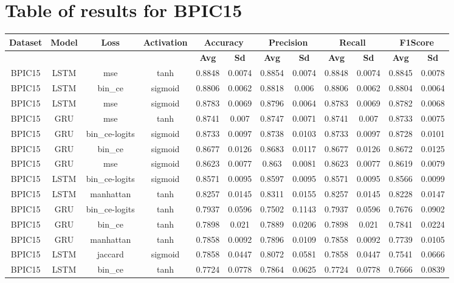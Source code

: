 \documentclass{article}%
\begin{document}
%
\normalsize%
\section{Table of results for BPIC15}%
\label{sec:TableofresultsforBPIC15}%
\begin{tabular}{|c|c|c|c|c|c|c|c|c|c|c|c|}%
\hline%
\rowcolor{lightgray!70}%
\textbf{Dataset}&\textbf{Model}&\textbf{Loss}&\textbf{Activation}&\multicolumn{2}{c|}{\textbf{Accuracy}}&\multicolumn{2}{c|}{\textbf{Precision}}&\multicolumn{2}{c|}{\textbf{Recall}}&\multicolumn{2}{c|}{\textbf{F1Score}}\\%
\hline%
\rowcolor{lightgray!70}%
\textbf{}&\textbf{}&\textbf{}&\textbf{}&\textbf{Avg}&\textbf{Sd}&\textbf{Avg}&\textbf{Sd}&\textbf{Avg}&\textbf{Sd}&\textbf{Avg}&\textbf{Sd}\\%
\hline%
BPIC15&LSTM&mse&tanh&0.8848&0.0074&0.8854&0.0074&0.8848&0.0074&0.8845&0.0078\\%
\hline%
BPIC15&LSTM&bin\_ce&sigmoid&0.8806&0.0062&0.8818&0.006&0.8806&0.0062&0.8804&0.0064\\%
\hline%
BPIC15&LSTM&mse&sigmoid&0.8783&0.0069&0.8796&0.0064&0.8783&0.0069&0.8782&0.0068\\%
\hline%
BPIC15&GRU&mse&tanh&0.8741&0.007&0.8747&0.0071&0.8741&0.007&0.8733&0.0075\\%
\hline%
BPIC15&GRU&bin\_ce{-}logits&sigmoid&0.8733&0.0097&0.8738&0.0103&0.8733&0.0097&0.8728&0.0101\\%
\hline%
BPIC15&GRU&bin\_ce&sigmoid&0.8677&0.0126&0.8683&0.0117&0.8677&0.0126&0.8672&0.0125\\%
\hline%
BPIC15&GRU&mse&sigmoid&0.8623&0.0077&0.863&0.0081&0.8623&0.0077&0.8619&0.0079\\%
\hline%
BPIC15&LSTM&bin\_ce{-}logits&sigmoid&0.8571&0.0095&0.8597&0.0095&0.8571&0.0095&0.8566&0.0099\\%
\hline%
BPIC15&LSTM&manhattan&tanh&0.8257&0.0145&0.8311&0.0155&0.8257&0.0145&0.8228&0.0147\\%
\hline%
BPIC15&GRU&bin\_ce{-}logits&tanh&0.7937&0.0596&0.7502&0.1143&0.7937&0.0596&0.7676&0.0902\\%
\hline%
BPIC15&GRU&bin\_ce&tanh&0.7898&0.021&0.7889&0.0206&0.7898&0.021&0.7841&0.0224\\%
\hline%
BPIC15&GRU&manhattan&tanh&0.7858&0.0092&0.7896&0.0109&0.7858&0.0092&0.7739&0.0105\\%
\hline%
BPIC15&LSTM&jaccard&sigmoid&0.7858&0.0447&0.8072&0.0581&0.7858&0.0447&0.7541&0.0666\\%
\hline%
BPIC15&LSTM&bin\_ce&tanh&0.7724&0.0778&0.7864&0.0625&0.7724&0.0778&0.7666&0.0839\\%

\end{tabular}
\end{document}
